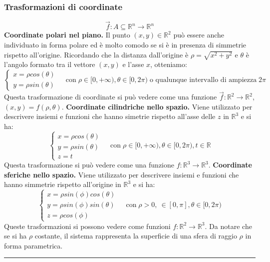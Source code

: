 \subsubsection*{Trasformazioni di coordinate}
\[
    \vec{f}: A\subseteq \mathbb{R}^n \rightarrow  \mathbb{R}^n
\]
\textbf{Coordinate polari nel piano.} Il punto $(x,y) \in \mathbb{R}^2$ può essere anche individuato in forma polare ed è molto comodo se si è in presenza di simmetrie rispetto all'origine. Ricordando che la distanza dall'origine è $\rho = \sqrt{x^2+ y^2}$ e $\theta$ è l'angolo formato tra il vettore $(x,y)$ e l'asse $x$, otteniamo:
\[
    \begin{cases}
        x = \rho cos(\theta)\\
        y = \rho sin(\theta)
    \end{cases} \;\;\;\;\text{con} \; \rho \in[0,+\infty), \theta \in [0,2\pi) \;\text{o qualunque intervallo di ampiezza} \; 2\pi
\]
Questa trasformazione di coordinate si può vedere come una funzione $\vec{f}: \mathbb{R}^2 \rightarrow \mathbb{R}^2$, $(x,y) = f(\rho, \theta)$.\newline
\newline
\textbf{Coordinate cilindriche nello spazio.} Viene utilizzato per descrivere insiemi e funzioni che hanno simetrie rispetto all'asse delle $z$ in $\mathbb{R}^3$ e si ha:
\[
    \begin{cases}
        x = \rho cos(\theta)\\
        y = \rho sin(\theta)\\
        z = t
    \end{cases} \;\;\;\;\text{con}\; \rho \in [0, +\infty), \theta \in [0, 2\pi), t \in \mathbb{R}
\]
Questa trasformazione si può vedere come una funzione $f: \mathbb{R}^3 \rightarrow \mathbb{R}^3$.\newline
\newline
\textbf{Coordinate sferiche nello spazio.} Viene utilizzato per descrivere insiemi e funzioni che hanno simmetrie rispetto all'origine in $\mathbb{R}^3$ e si ha:
\[
    \begin{cases}
        x = \rho sin(\phi)cos(\theta)\\
        y =\rho sin(\phi)sin(\theta)\\
        z = \rho cos(\phi)
    \end{cases} \;\;\;\;\text{con}\; \rho > 0, \ \in[0,\pi], \theta \in[0,2\pi)
\]
Queste trasformazioni si possono vedere come funzioni $f: \mathbb{R}^2 \rightarrow \mathbb{R}^3$. \newline
Da notare che se si ha $\rho$ costante, il sistema rappresenta la superficie di una sfera di raggio $\rho$ in forma parametrica.\newline
\rule{\textwidth}{0,4pt}

